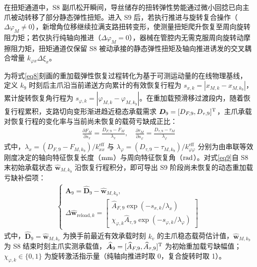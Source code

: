 \documentclass{JQRnew}
\begin{document}
在扭矩通道中，S8 副爪松开瞬间，导丝储存的扭转弹性势能通过微小回捻已向主爪被动转移了部分静态弹性扭矩。进入 S9 后，若执行推进与旋转复合操作（$\Delta\varphi_{M} \neq 0$），新增角位移继续拉满支路扭转变形，使测量扭矩爬升恢复至周向旋转阻力矩；若仅执行纯轴向推进（$\Delta\varphi_{M} = 0$），器械在管腔内无需克服周向旋转动摩擦阻力矩，扭矩通道仅保留 S8 被动承接的静态弹性扭矩及轴向推进诱发的交叉耦合增量 $k_{\varphi x}\Delta\xi_{x}$。

为将式\eqref{eq8}刻画的重加载弹性恢复过程转化为基于可测运动量的在线物理基线，定义 $k_{9}$ 时刻后主爪沿当前递送方向累计的有效恢复行程为 $s_{x,k} = |x_{M,k} - x_{M,k_{9}}|$，累计旋转恢复角行程为 $s_{\varphi,k} = |\varphi_{M,k} - \varphi_{M,k_{9}}|$。在重加载预滑移过渡段内，随着恢复行程累积，支路切向变形渐进趋近稳态承载需求 $\bm{D}_{9} = [D_{F,9},D_{\tau,9}]^{\rm T}$，主爪承载对恢复行程的变化率与当前尚未恢复的载荷亏缺成正比：
\begin{align}
	\label{eq9}
	\frac{\partial F_{M}}{\partial s_{x}} = \frac{D_{F,9} - F_{M}}{\lambda_{x}},\quad
	\frac{\partial \tau_{M}}{\partial s_{\varphi}} = \frac{D_{\tau,9} - \tau_{M}}{\lambda_{\varphi}}
\end{align}
式中，$\lambda_{x} = (D_{F,9} - F_{M,k_{9}})/k_{xx}^{\text{eff}}$ 与 $\lambda_{\varphi} = (D_{\tau,9} - \tau_{M,k_{9}})/k_{\varphi\varphi}^{\text{eff}}$ 分别为由串联等效刚度决定的轴向特征恢复长度（${\rm mm}$）与周向特征恢复角（${\rm rad}$）。对式\eqref{eq9}自 S8 末初始承载状态 $\widehat{\bm{w}}_{M,k_{9}}$ 沿恢复行程积分，即可导出 S9 阶段尚未恢复的动态重加载亏缺补偿项：
\begin{align}
	\label{eq10}
	\begin{cases}
		\widehat{\bm{A}}_{9} = \widehat{\bm{D}}_{9} - \widehat{\bm{w}}_{M,k_{9}}, \\
		\Delta\widehat{\bm{w}}_{\text{reload},k} =
		\begin{bmatrix}
			\widehat{A}_{F,9}\exp( - s_{x,k}/\lambda_{x}) \\
			\chi_{\varphi,k}\widehat{A}_{\tau,9}\exp( - s_{\varphi,k}/\lambda_{\varphi})
		\end{bmatrix}
	\end{cases}
\end{align}
式中，$\widehat{\bm{D}}_{9} = \widehat{\bm{w}}_{M,k_{v}}$ 为换手前最近有效承载时刻 $k_{v}$ 的主爪稳态载荷估计值，$\widehat{\bm{w}}_{M,k_{9}}$ 为 S8 结束时刻主爪实测承载值，$\widehat{\bm{A}}_{9} = [\widehat{A}_{F,9},\widehat{A}_{\tau,9}]^{\rm T}$ 为初始重加载亏缺幅值；$\chi_{\varphi,k} \in \{0,1\}$ 为旋转激活指示量（纯轴向推进时取 0，复合旋转时取 1）。
\end{document}
